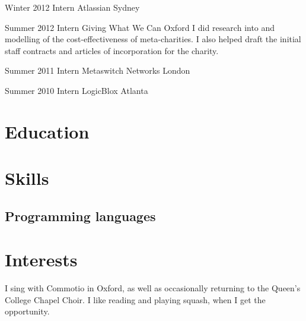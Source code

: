\documentclass[12pt,a4paper,sans]{moderncv}
\begin{document}
\cventry
{Winter 2012}
{Intern}
{Atlassian}
{Sydney}
{}
{}

\cventry
{Summer 2012}
{Intern}
{Giving What We Can}
{Oxford}
{}
{
  I did research into and modelling of the cost-effectiveness of meta-charities.
  I also helped draft the initial staff contracts and articles of incorporation for the charity.
}

\cventry
{Summer 2011}
{Intern}
{Metaswitch Networks}
{London}
{}
{}

\cventry
{Summer 2010}
{Intern}
{LogicBlox}
{Atlanta}
{}
{}

\nocite{*}
\printbibliography[title={Publications}]

\section{Education}

\section{Skills}

\subsection{Programming languages}


\section{Interests}
I sing with Commotio in Oxford, as well as occasionally returning to the Queen's
College Chapel Choir. I like reading and playing squash, when I get the opportunity.
\end{document}
